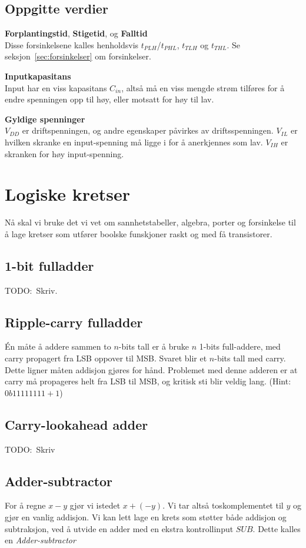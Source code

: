 \documentclass[12pt,a4paper,norsk]{article}
\begin{document}
\subsection{Oppgitte verdier}
\textbf{Forplantingstid}, \textbf{Stigetid}, og \textbf{Falltid}\\
Disse forsinkelsene kalles henholdsvis $t_{PLH}$/$t_{PHL}$, $t_{TLH}$ og
$t_{THL}$. Se seksjon~\ref{sec:forsinkelser} om forsinkelser.

\textbf{Inputkapasitans}\\
Input har en viss kapasitans $C_{in}$, altså må en viss mengde strøm tilføres for å endre
spenningen opp til høy, eller motsatt for høy til lav.

\textbf{Gyldige spenninger}\\
$V_{DD}$ er driftspenningen, og andre egenskaper påvirkes av driftsspenningen.
$V_{IL}$ er hvilken skranke en input-spenning må ligge i for å anerkjennes som
lav. $V_{IH}$ er skranken for høy input-spenning.

\section{Logiske kretser}\label{sec:logic_circuits}
Nå skal vi bruke det vi vet om sannhetstabeller, algebra, porter og forsinkelse
til å lage kretser som utfører boolske funskjoner raskt og med få transistorer.

\subsection{1-bit fulladder}
TODO:\ Skriv.

\subsection{Ripple-carry fulladder}\label{sec:ripple_carry_fulladder}
Én måte å addere sammen to $n$-bits tall er å bruke $n$ 1-bits full-addere, med
carry propagert fra LSB oppover til MSB\@. Svaret blir et $n$-bits tall med
carry. Dette ligner måten addisjon gjøres for hånd. Problemet med denne adderen
er at carry må propageres helt fra LSB til MSB, og kritisk sti blir veldig lang.
(Hint: $0b11111111 + 1$)

\subsection{Carry-lookahead adder}
TODO:\ Skriv

\subsection{Adder-subtractor}
For å regne $x-y$ gjør vi istedet $x+(-y)$. Vi tar altså toskomplementet til $y$
og gjør en vanlig addisjon. Vi kan lett lage en krets som støtter både addisjon
og subtraksjon, ved å utvide en adder med en ekstra kontrollinput $SUB$. Dette
kalles en \textit{Adder-subtractor}
\end{document}

